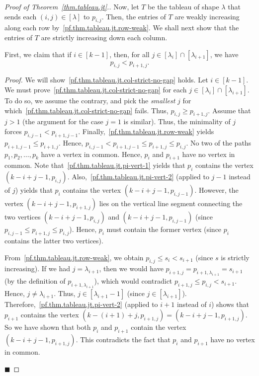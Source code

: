 \documentclass[reqno]{amsart}
\newcommand{\0}{\phantom{c}}
\newcommand{\diag}[1]{\left[#1\right]} %
\newenvironment{subproof}{\textit{Proof.} }{\hfill$\blacksquare$ \medskip}
\newenvironment{verlong}{}{}
\newcommand{\tup}[1]{\left( #1 \right)}
\newcommand{\ive}[1]{\left[ #1 \right]}
\theoremstyle{plain}
\theoremstyle{definition}
\numberwithin{equation}{section}
\begin{document}
\begin{verlong}
\begin{proof}[Proof of Theorem~\ref{thm.tableau.jt}.]
Now, let $T$ be the tableau of shape $\lambda$ that sends each $(i,j) \in \diag{\lambda}$  to $p_{i,j}$.
Then, the entries of $T$ are weakly increasing along each row by~\eqref{pf.thm.tableau.jt.row-weak}.
We shall next show that the entries of $T$ are strictly increasing down each column.

First, we claim that if $i \in \ive{k-1}$, then, for all $j \in \ive{\lambda_i} \cap \ive{\lambda_{i+1}}$, we have
\begin{equation}
\label{pf.thm.tableau.jt.col-strict-no-gap}
p_{i,j} < p_{i+1,j}.
\end{equation}

\begin{subproof}
We will show~\eqref{pf.thm.tableau.jt.col-strict-no-gap} holds.
Let $i \in \ive{k-1}$.
We must prove~\eqref{pf.thm.tableau.jt.col-strict-no-gap} for each $j \in \ive{\lambda_i}  \cap \ive{\lambda_{i+1}}  $.
To do so, we assume the contrary, and pick the \emph{smallest} $j$ for which~\eqref{pf.thm.tableau.jt.col-strict-no-gap} fails.
Thus, $p_{i,j} \geq p_{i+1,j}$.
Assume that $j > 1$ (the argument for the case $j=1$ is similar).
Thus, the minimality of $j$ forces $p_{i,j-1} < p_{i+1,j-1}$.
Finally,~\eqref{pf.thm.tableau.jt.row-weak} yields $p_{i+1,j-1} \leq p_{i+1,j}$.
Hence, $p_{i,j-1} < p_{i+1,j-1} \leq p_{i+1,j} \leq p_{i,j}$.
No two of the paths $p_1, p_2, \dotsc, p_k$ have a vertex in common.
Hence, $p_i$ and $p_{i+1}$ have no vertex in common.
Note that~\eqref{pf.thm.tableau.jt.pi-vert-1} yields that $p_i$ contains the vertex $\tup{k-i+j-1, p_{i,j}}$.
Also,~\eqref{pf.thm.tableau.jt.pi-vert-2} (applied to $j-1$ instead of $j$) yields that $p_i$ contains the vertex $\tup{k-i+j-1, p_{i,j-1}}$.
However, the vertex $\tup{k-i+j-1, p_{i+1,j}}$ lies on the vertical line segment connecting the two vertices $\tup{k-i+j-1, p_{i,j}}$ and $\tup{k-i+j-1,p_{i,j-1}}$ (since $p_{i,j-1} \leq p_{i+1,j} \leq p_{i,j}$).
Hence, $p_i$ must contain the former vertex (since $p_i$ contains the latter two vertices).

From~\eqref{pf.thm.tableau.jt.row-weak}, we obtain $p_{i,j} \leq s_i < s_{i+1}$ (since $s$ is strictly increasing).
If we had $j = \lambda_{i+1}$, then we would have $p_{i+1,j} = p_{i+1,\lambda_{i+1}} = s_{i+1}$ (by the definition of
$p_{i+1,\lambda_{i+1}}$), which would contradict $p_{i+1,j} \leq p_{i,j} < s_{i+1}$.
Hence, $j \neq \lambda_{i+1}$. Thus, $j \in \ive{\lambda_{i+1}-1}$ (since $j \in \ive{\lambda_{i+1}}$).
Therefore,~\eqref{pf.thm.tableau.jt.pi-vert-2} (applied to $i+1$ instead of $i$) shows that $p_{i+1}$ contains the vertex $\tup{k-(i+1)+j, p_{i+1,j}} = \tup{k-i+j-1, p_{i+1,j}}$.
So we have shown that both $p_i$ and $p_{i+1}$ contain the vertex $\tup{k-i+j-1, p_{i+1,j}}$.
This contradicts the fact that $p_i$ and $p_{i+1}$ have no vertex in common.


\end{subproof}
\end{proof}
\end{verlong}
\end{document}
